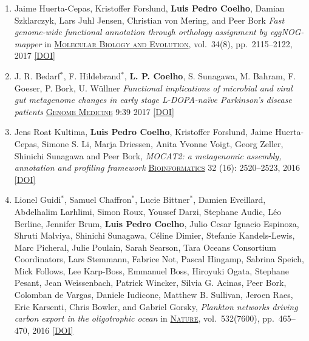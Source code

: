 \documentclass{article}
\newcommand\showdoi[1]{%
    \href{http://dx.doi.org/#1}{[DOI]}%
}
\newcommand\pubname[1]{\textsc{\uline{#1}}}
\newcommand\contribution[1]{\relax}
\newcommand\costar{${}^{*}$}
\begin{document}
\begin{enumerate}[resume]
\item Jaime Huerta-Cepas, Kristoffer Forslund, \textbf{Luis Pedro Coelho},
Damian Szklarczyk, Lars Juhl Jensen, Christian von Mering, and Peer Bork
\emph{Fast genome-wide functional annotation through orthology assignment by
eggNOG-mapper} in \pubname{Molecular Biology and Evolution}, vol.\ 34(8), pp.\
2115--2122, 2017 \showdoi{10.1093/molbev/msx148}
\contribution{I contributed to the evaluation of the tool, in particular, in
the evaluation of the suitability of the tool to metagenomics data.}

\item J. R. Bedarf\costar, F. Hildebrand\costar, \textbf{L. P. Coelho}, S.
Sunagawa, M. Bahram, F. Goeser, P. Bork, U. Wüllner \emph{Functional
implications of microbial and viral gut metagenome changes in early stage
L-DOPA-naïve Parkinson’s disease patients} \pubname{Genome Medicine} 9:39 2017
\showdoi{10.1186/s13073-017-0428-y}
\contribution{I built machine learning models based on metagenomics data.}

\item Jens Roat Kultima, \textbf{Luis Pedro Coelho}, Kristoffer Forslund, Jaime
Huerta-Cepas, Simone S. Li, Marja Driessen, Anita Yvonne Voigt, Georg Zeller,
Shinichi Sunagawa and Peer Bork, \emph{MOCAT2: a metagenomic assembly,
annotation and profiling framework} \pubname{Bioinformatics} 32 (16):
2520--2523, 2016 \showdoi{10.1093/bioinformatics/btw183}
\contribution{I participated in the design and implementation of the proposed tool.}

\item Lionel Guidi\costar, Samuel Chaffron\costar, Lucie Bittner\costar,
Damien Eveillard, Abdelhalim Larhlimi, Simon Roux, Youssef Darzi, Stephane
Audic, Léo Berline, Jennifer Brum, \textbf{Luis Pedro Coelho}, Julio Cesar
Ignacio Espinoza, Shruti Malviya, Shinichi Sunagawa, Céline Dimier, Stefanie
Kandels-Lewis, Marc Picheral, Julie Poulain, Sarah Searson, Tara Oceans
Consortium Coordinators, Lars Stemmann, Fabrice Not, Pascal Hingamp, Sabrina
Speich, Mick Follows, Lee Karp-Boss, Emmanuel Boss, Hiroyuki Ogata, Stephane
Pesant, Jean Weissenbach, Patrick Wincker, Silvia G. Acinas, Peer Bork,
Colomban de Vargas, Daniele Iudicone, Matthew B. Sullivan, Jeroen Raes, Eric
Karsenti, Chris Bowler, and Gabriel Gorsky, \emph{Plankton networks driving
carbon export in the oligotrophic ocean} in \pubname{Nature}, vol.\ 532(7600),
pp.\ 465--470, 2016 \showdoi{10.1038/nature16942}
\contribution{I performed functional analysis of the metagenomics data.}


\end{enumerate}
\end{document}
